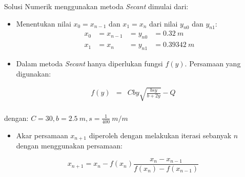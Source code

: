 \documentclass[11pt]{article}
\providecommand{\tightlist}{%
      \setlength{\itemsep}{0pt}\setlength{\parskip}{0pt}}
\begin{document}
Solusi Numerik menggunakan metoda \emph{Secant} dimulai dari:

\begin{itemize}
\item
  Menentukan nilai \(x_0 = x_{n-1}\) dan \(x_1 = x_n\) dari nilai
  \(y_{n0}\) dan \(y_{n1}\):
  \[\begin{aligned}x_0 &= x_{n-1} &= y_{n0} &= 0.32\ m \\
  x_1 &= x_{n} &= y_{n1} &= 0.39342\ m\end{aligned}\]
\item
  Dalam metoda \emph{Secant} hanya diperlukan fungsi \(f(y)\). Persamaan
  yang digunakan:
\end{itemize}

\[\begin{aligned} f(y) &=& C b y \sqrt{\frac{b s y}{b + 2 y}} - Q \\
\end{aligned}\]

dengan: \(C = 30, b = 2.5\ m, s = \frac{1}{400}\ m/m\)

\begin{itemize}
\tightlist
\item
  Akar persamaan \(x_{n+1}\) diperoleh dengan melakukan iterasi sebanyak
  \(n\) dengan menggunakan persamaan:
\end{itemize}

\[x_{n+1} = x_n - f(x_n)\frac{x_n - x_{n-1}}{f(x_n) - f(x_{n-1})}\]
\end{document}
